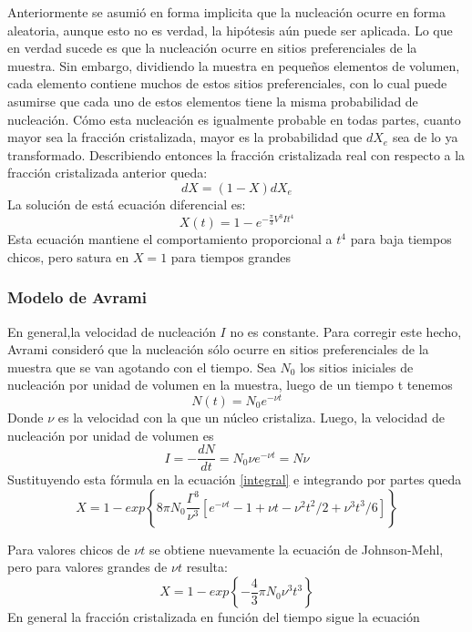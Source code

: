 \documentclass[12pt]{article}
\theoremstyle{definition}
\theoremstyle{remark}
\begin{document}
Anteriormente se asumió en forma implicita que la nucleación ocurre en forma aleatoria, aunque esto no es verdad, la hipótesis aún puede ser aplicada. Lo que en verdad sucede es que la nucleación ocurre en sitios preferenciales de la muestra. Sin embargo, dividiendo la muestra en pequeños elementos de volumen, cada elemento contiene muchos de estos sitios preferenciales, con lo cual puede asumirse que cada uno de estos elementos tiene la misma probabilidad de nucleación. Cómo esta nucleación es igualmente probable en todas partes, cuanto mayor sea la fracción cristalizada, mayor es la probabilidad que $dX_e$ sea de lo ya transformado. Describiendo entonces la fracción cristalizada real con respecto a la fracción cristalizada anterior queda:
\begin{equation}
 dX = (1 - X)dX_e
\end{equation}
La solución de está ecuación diferencial es:
\begin{equation}
	X(t)=1-e^{-\frac{\pi}{3}V^3 I t^4}
\end{equation}
Esta ecuación mantiene el comportamiento proporcional a $t^4$ para baja tiempos chicos, pero satura en $X = 1$ para tiempos grandes

\subsubsection{Modelo de Avrami}
En general,la velocidad de nucleación $I$ no es constante. Para corregir este hecho, Avrami consideró que la nucleación sólo ocurre en sitios preferenciales de la muestra que se van agotando con el tiempo. Sea $N_0$ los sitios iniciales de nucleación por unidad de volumen en la muestra, luego de un tiempo t tenemos
\begin{equation}
	N(t) = N_0e^{-\nu t}
\end{equation}
Donde $\nu$ es la velocidad con la que un núcleo cristaliza. Luego, la velocidad de nucleación por unidad de volumen es 
\begin{equation}
	I = -\frac{dN}{dt} = N_0\nu e^{-\nu t} = N\nu
\end{equation}
Sustituyendo esta fórmula en la ecuación \ref{integral} e integrando por partes queda
\begin{equation}
	X = 1-exp \left\lbrace 8\pi N_0\frac{\Gamma^3}{\nu^3} \left[ e^{-\nu t} -1+\nu t -\nu^2t^2/2 + \nu^3 t^3/6 \right] \right\rbrace
\end{equation}

Para valores chicos de $\nu t$ se obtiene nuevamente la ecuación de Johnson-Mehl, pero para valores grandes de $\nu t$ resulta:
\begin{equation}
	X = 1 - exp\left\lbrace -\frac{4}{3} \pi N_0 \nu^3 t^3 \right\rbrace
\end{equation}
En general la fracción cristalizada en función del tiempo sigue la ecuación
\end{document}
